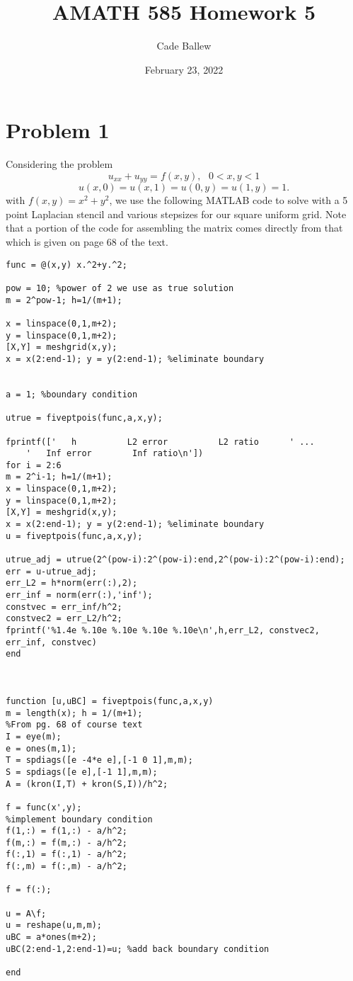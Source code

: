 \documentclass{article}
\title{AMATH 585 Homework 5}
\author{Cade Ballew}
\date{February 23, 2022}
\begin{document}
	
\maketitle
	
\section{Problem 1}
Considering the problem 
\[
u_{xx} + u_{yy} = f(x,y) ,~~~0 < x,y < 1 
\]
\[
u(x,0) = u(x,1) = u(0,y) = u(1,y) = 1.
\]
with $f(x,y) = x^2 + y^2$, we use the following MATLAB code to solve with a 5 point Laplacian stencil and various stepsizes for our square uniform grid. Note that a portion of the code for assembling the matrix comes directly from that which is given on page 68 of the text.
\begin{verbatim}
func = @(x,y) x.^2+y.^2;

pow = 10; %power of 2 we use as true solution
m = 2^pow-1; h=1/(m+1);

x = linspace(0,1,m+2);
y = linspace(0,1,m+2);
[X,Y] = meshgrid(x,y);
x = x(2:end-1); y = y(2:end-1); %eliminate boundary


a = 1; %boundary condition

utrue = fiveptpois(func,a,x,y); 

fprintf(['   h          L2 error          L2 ratio      ' ...
    '   Inf error        Inf ratio\n'])
for i = 2:6
m = 2^i-1; h=1/(m+1);
x = linspace(0,1,m+2);
y = linspace(0,1,m+2);
[X,Y] = meshgrid(x,y);
x = x(2:end-1); y = y(2:end-1); %eliminate boundary
u = fiveptpois(func,a,x,y); 

utrue_adj = utrue(2^(pow-i):2^(pow-i):end,2^(pow-i):2^(pow-i):end);
err = u-utrue_adj;
err_L2 = h*norm(err(:),2);
err_inf = norm(err(:),'inf');
constvec = err_inf/h^2;
constvec2 = err_L2/h^2;
fprintf('%1.4e %.10e %.10e %.10e %.10e\n',h,err_L2, constvec2, err_inf, constvec)
end



function [u,uBC] = fiveptpois(func,a,x,y)
m = length(x); h = 1/(m+1);
%From pg. 68 of course text
I = eye(m);
e = ones(m,1);
T = spdiags([e -4*e e],[-1 0 1],m,m);
S = spdiags([e e],[-1 1],m,m);
A = (kron(I,T) + kron(S,I))/h^2;

f = func(x',y);
%implement boundary condition
f(1,:) = f(1,:) - a/h^2;
f(m,:) = f(m,:) - a/h^2;
f(:,1) = f(:,1) - a/h^2;
f(:,m) = f(:,m) - a/h^2;

f = f(:);

u = A\f;
u = reshape(u,m,m);
uBC = a*ones(m+2);
uBC(2:end-1,2:end-1)=u; %add back boundary condition

end
\end{verbatim}
\end{document}
